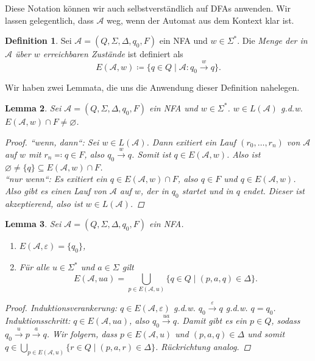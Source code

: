 \documentclass[11pt, a4paper]{article}
\theoremstyle{definition}
\newtheorem{definition}{Definition}[section]
\theoremstyle{plain}
\newtheorem{lemma}[definition]{Lemma}
\numberwithin{equation}{section}
\newcommand{\reaches}[1]{\overset{#1}{\rightarrow}}
\let\emptyset\varnothing
\begin{document}
Diese Notation können wir auch selbstverständlich auf DFAs anwenden. Wir lassen gelegentlich, dass $\mathcal{A}$ weg, wenn der Automat aus dem Kontext klar ist.
\begin{definition}
	Sei $\mathcal{A} = (Q, \Sigma, \Delta, q_0, F)$ ein NFA und $w \in \Sigma^\ast$. Die \textit{Menge der in $\mathcal{A}$ über $w$ erreichbaren Zustände} ist definiert als
	$$
		E(\mathcal{A}, w) \coloneqq \{ q \in Q \mid \mathcal{A}: q_0 \reaches{w} q \}.
	$$
\end{definition}
Wir haben zwei Lemmata, die uns die Anwendung dieser Definition nahelegen.
\begin{lemma}\label{lem:reach1}
	Sei $\mathcal{A} = (Q, \Sigma, \Delta, q_0, F)$ ein NFA und $w \in \Sigma^\ast$. $w \in L(\mathcal{A})$ {g.d.w.} $E(\mathcal{A}, w) \cap F \neq \emptyset$.
	\begin{proof}
		``wenn, dann``: Sei $w \in L(\mathcal{A})$. Dann exitiert ein Lauf $(r_0, \ldots, r_n)$ von $\mathcal{A}$ auf $w$ mit $r_n \eqqcolon q \in F$, also $q_0 \reaches{w} q$. Somit ist $q \in E(\mathcal{A}, w)$. Also ist $\emptyset \neq \{q\} \subseteq E(\mathcal{A}, w) \cap F$.\\
		``nur wenn``: Es exitiert ein $q \in E(\mathcal{A}, w) \cap F$, also $q \in F$ und $q \in E(\mathcal{A}, w)$. Also gibt es einen Lauf von $\mathcal{A}$ auf $w$, der in $q_0$ startet und in $q$ endet. Dieser ist akzeptierend, also ist $w \in L(\mathcal{A})$.
	\end{proof}
\end{lemma}
\begin{lemma}\label{lem:reach2}
	Sei $\mathcal{A} = (Q, \Sigma, \Delta, q_0, F)$ ein NFA.
	\begin{enumerate}
		\item $E(\mathcal{A}, \varepsilon) = \{q_0\}$,
		\item Für alle $u \in \Sigma^\ast$ und $a \in \Sigma$ gilt
			$$
				E(\mathcal{A}, ua) = \bigcup_{p \in E(\mathcal{A}, u)} \{ q \in Q \mid (p, a, q) \in \Delta \}.
			$$
	\end{enumerate}
	\begin{proof}
		Induktionsverankerung: $q \in E(\mathcal{A}, \varepsilon)$ {g.d.w.} $q_0 \reaches{\varepsilon} q$ {g.d.w.} $q = q_0$. \checkmark\\
		Induktionsschritt: $q \in E(\mathcal{A}, ua)$, also $q_0 \reaches{ua} q$. Damit gibt es ein $p \in Q$, sodass $q_0 \reaches{u} p \reaches{a} q$. Wir folgern, dass $p \in E(\mathcal{A}, u)$ und $(p, a, q) \in \Delta$ und somit $q \in \bigcup_{p \in E(\mathcal{A}, u)} \{ r \in Q \mid (p, a, r) \in \Delta \}$. Rückrichtung analog.
	\end{proof}
\end{lemma}
\end{document}
